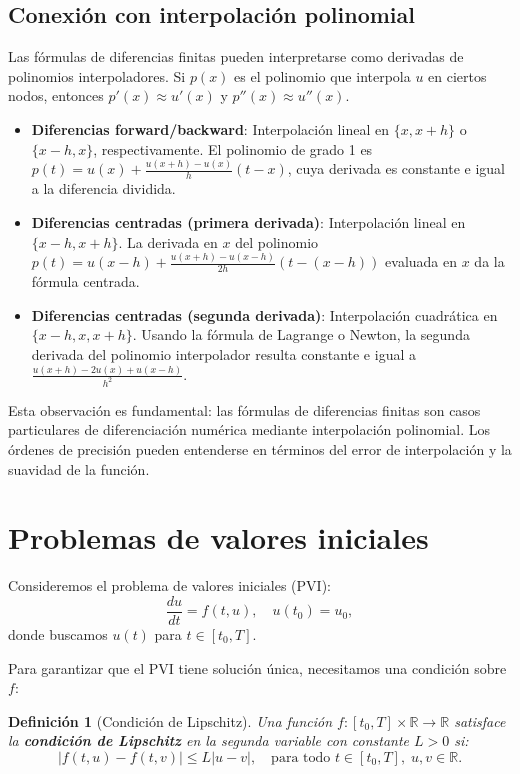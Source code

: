 \documentclass[a4paper,11pt]{report}
\newtheorem{definition}[theorem]{Definición}
\begin{document}
\subsection{Conexión con interpolación polinomial}

Las fórmulas de diferencias finitas pueden interpretarse como derivadas de polinomios interpoladores. Si $p(x)$ es el polinomio que interpola $u$ en ciertos nodos, entonces $p'(x) \approx u'(x)$ y $p''(x) \approx u''(x)$.

\begin{itemize}
\item \textbf{Diferencias forward/backward}: Interpolación lineal en $\{x, x+h\}$ o $\{x-h, x\}$, respectivamente. El polinomio de grado 1 es $p(t) = u(x) + \frac{u(x+h)-u(x)}{h}(t-x)$, cuya derivada es constante e igual a la diferencia dividida.

\item \textbf{Diferencias centradas (primera derivada)}: Interpolación lineal en $\{x-h, x+h\}$. La derivada en $x$ del polinomio $p(t) = u(x-h) + \frac{u(x+h)-u(x-h)}{2h}(t-(x-h))$ evaluada en $x$ da la fórmula centrada.

\item \textbf{Diferencias centradas (segunda derivada)}: Interpolación cuadrática en $\{x-h, x, x+h\}$. Usando la fórmula de Lagrange o Newton, la segunda derivada del polinomio interpolador resulta constante e igual a $\frac{u(x+h) - 2u(x) + u(x-h)}{h^2}$.
\end{itemize}

Esta observación es fundamental: las fórmulas de diferencias finitas son casos particulares de diferenciación numérica mediante interpolación polinomial. Los órdenes de precisión pueden entenderse en términos del error de interpolación y la suavidad de la función.

\section{Problemas de valores iniciales}

Consideremos el problema de valores iniciales (PVI):
\[
\frac{du}{dt} = f(t, u), \quad u(t_0) = u_0,
\]
donde buscamos $u(t)$ para $t \in [t_0, T]$.

Para garantizar que el PVI tiene solución única, necesitamos una condición sobre $f$:

\begin{definition}[Condición de Lipschitz]\label{def:lipschitz_ode}
Una función $f: [t_0, T] \times \mathbb{R} \to \mathbb{R}$ satisface la \textbf{condición de Lipschitz} en la segunda variable con constante $L > 0$ si:
\[
|f(t, u) - f(t, v)| \leq L |u - v|, \quad \text{para todo } t \in [t_0, T], \; u, v \in \mathbb{R}.
\]
\end{definition}
\end{document}
